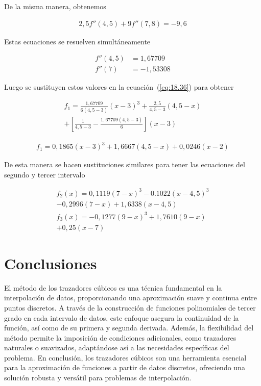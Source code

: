 \documentclass[conference]{IEEEtran}
\begin{document}
De la misma manera, obtenemos

\begin{align*}
	2,5f''(4,5) + 9f''(7,8) = -9,6
\end{align*}

Estas ecuaciones se resuelven simultáneamente

\begin{align*}
	f''(4,5) & = 1,67709  \\
	f''(7)   & = -1,53308
\end{align*}

Luego se sustituyen estos valores en la ecuación~(\ref{eq:18.36})
para obtener

\begin{multline*}
	f_{1} = \frac{1,67709}{6(4,5 - 3)}{(x - 3)}^{3}
	+ \frac{2,5}{4,5 - 3}(4,5 - x) \\
	+ [\frac{1}{4,5 - 3} - \frac{1,67709 (4,5 - 3)}{6}](x - 3)
\end{multline*}

\begin{align*}
	f_{1} = 0,1865 {(x - 3)}^{3} + 1,6667 (4,5 - x) + 0,0246 (x - 2)
\end{align*}

De esta manera se hacen sustituciones similares para tener las
ecuaciones del segundo y tercer intervalo

\begin{multline*}
	f_{2}(x) = 0,1119 {(7 - x)}^{3} - 0.1022 {(x - 4,5)}^{3} \\
	- 0,2996 (7 - x) + 1,6338 (x - 4,5) \\
	f_{3}(x) = -0,1277{(9 - x)}^{3} + 1,7610 (9 - x) \\
	+ 0,25(x - 7)
\end{multline*}

\section{Conclusiones}

El método de los trazadores cúbicos es una técnica fundamental en
la interpolación de datos, proporcionando una aproximación suave y continua
entre puntos discretos. A través de la construcción de funciones polinomiales
de tercer grado en cada intervalo de datos, este enfoque asegura la continuidad
de la función, así como de su primera y segunda derivada. Además, la
flexibilidad del método permite la imposición de condiciones adicionales,
como trazadores naturales o suavizados, adaptándose así a las necesidades
específicas del problema. En conclusión, los trazadores cúbicos son una 
herramienta esencial para la aproximación de funciones a partir de datos 
discretos, ofreciendo una solución robusta y versátil para problemas de 
interpolación.


\end{document}
